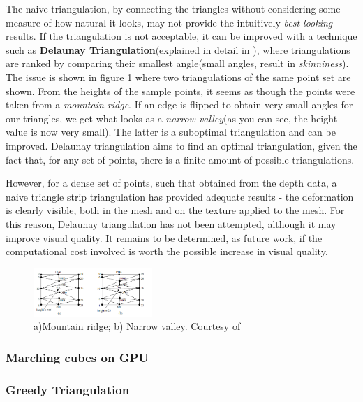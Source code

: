 \documentclass[]{article}
\begin{document}
The naive triangulation, by connecting the triangles without considering some measure of how natural it looks, may not provide the intuitively \textit{best-looking} results. If the triangulation is not acceptable, it can be improved with a technique such as \textbf{Delaunay Triangulation}(explained in detail in \cite[Chapter~9]{berg08}), where triangulations are ranked by comparing their smallest angle(small angles, result in \textit{skinniness}). The issue is shown in figure \ref{fig:MountainRidgeNarrowValley} where two triangulations of the same point set are shown. From the heights of the sample points, it seems as though the points were taken from a \textit{mountain ridge}. If an edge is flipped to obtain very small angles for our triangles, we get what looks as a \textit{narrow valley}(as you can see, the height value is now very small). The latter is a suboptimal triangulation and can be improved. Delaunay triangulation aims to find an optimal triangulation, given the fact that, for any set of points, there is a finite amount of possible triangulations.

However, for a dense set of points, such that obtained from the depth data, a naive triangle strip triangulation has provided adequate results - the deformation is clearly visible, both in the mesh and on the texture applied to the mesh. For this reason, Delaunay triangulation has not been attempted, although it may improve visual quality. It remains to be determined, as future work, if the computational cost involved is worth the possible increase in visual quality.

\begin{figure}[hbtp]
    \centering
    \includegraphics[width=0.4\textwidth]{figures/MountainRidgeNarrowValley.PNG}
    \caption{a)Mountain ridge; b) Narrow valley. Courtesy of \cite[Chapter~9]{berg08}}
    \label{fig:MountainRidgeNarrowValley}
\end{figure}


\subsubsection{Marching cubes on GPU}
\subsubsection{Greedy Triangulation}
\end{document}
